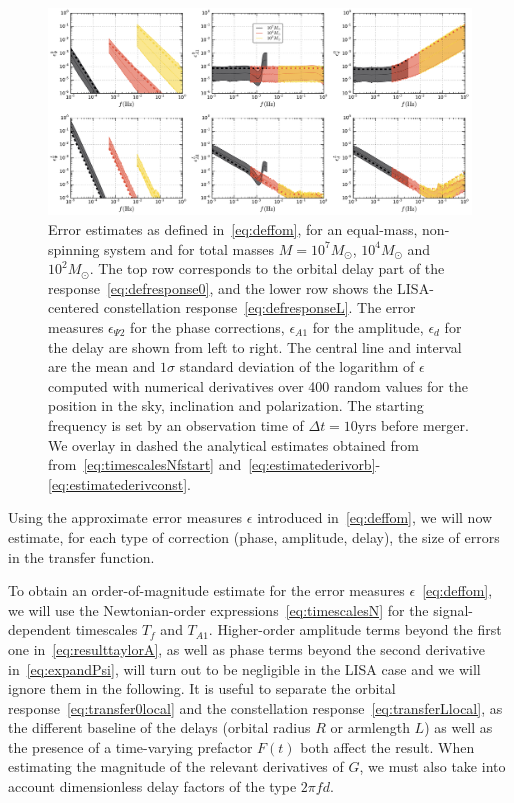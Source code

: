 \documentclass[aps,showpacs,twocolumn,
prd,superscriptaddress,nofootinbib]{revtex4-1}
\newcommand{\Msol}{M_{\odot}}
\newcommand{\Tf}{T_{f}}
\begin{document}
\begin{figure}
  \centering
  \includegraphics[width=.98\linewidth]{plots/lisafom_py.pdf}
  \caption{Error estimates as defined in~\eqref{eq:deffom}, for an equal-mass, non-spinning system and for total masses $M=10^{7} \Msol$, $10^{4} \Msol$ and $10^{2} \Msol$. The top row corresponds to the orbital delay part of the response~\eqref{eq:defresponse0}, and the lower row shows the LISA-centered constellation response~\eqref{eq:defresponseL}. The error measures $\epsilon_{\Psi 2}$ for the phase corrections, $\epsilon_{A1}$ for the amplitude, $\epsilon_{d}$ for the delay are shown from left to right. The central line and interval are the mean and $1\sigma$ standard deviation of the logarithm of $\epsilon$ computed with numerical derivatives over 400 random values for the position in the sky, inclination and polarization. The starting frequency is set by an observation time of $\Delta t = 10 \text{yrs}$ before merger. We overlay in dashed the analytical estimates obtained from from~\eqref{eq:timescalesNfstart} and~\eqref{eq:estimatederivorb}-\eqref{eq:estimatederivconst}.}
  \label{fig:fomLISA}
\end{figure}

Using the approximate error measures $\epsilon$ introduced in~\eqref{eq:deffom}, we will now estimate, for each type of correction (phase, amplitude, delay), the size of errors in the transfer function.

To obtain an order-of-magnitude estimate for the error measures $\epsilon$~\eqref{eq:deffom}, we will use the Newtonian-order expressions~\eqref{eq:timescalesN} for the signal-dependent timescales $\Tf$ and $T_{A1}$. Higher-order amplitude terms beyond the first one in~\eqref{eq:resulttaylorA}, as well as phase terms beyond the second derivative in~\eqref{eq:expandPsi}, will turn out to be  negligible in the LISA case and we will ignore them in the following. It is useful to separate the orbital response~\eqref{eq:transfer0local} and the constellation response~\eqref{eq:transferLlocal}, as the different baseline of the delays (orbital radius $R$ or armlength $L$) as well as the presence of a time-varying prefactor $F(t)$ both affect the result. When estimating the magnitude of the relevant derivatives of $G$, we must also take into account dimensionless delay factors of the type $2\pi f d$.
\end{document}
